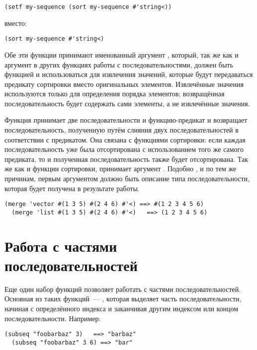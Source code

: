\begin{lstlisting}[style=lisprepl]
  (setf my-sequence (sort my-sequence #'string<))
\end{lstlisting}

\noindent{}вместо:

\begin{lstlisting}[style=lisprepl]
  (sort my-sequence #'string<)
\end{lstlisting}

Обе эти функции принимают именованный аргумент , который, так же как и аргумент
 в других функциях работы с последовательностями, должен быть функцией и
использоваться для извлечения значений, которые будут передаваться предикату сортировки
вместо оригинальных элементов.  Извлечённые значения используются только для определения
порядка элементов; возвращённая последовательность будет содержать сами элементы, а не
извлечённые значения.

Функция  принимает две последовательности и функцию-предикат и возвращает
последовательность, полученную путём слияния двух последовательностей в соответствии с
предикатом.  Она связана с функциями сортировки: если каждая последовательность
уже была отсортирована с использованием того же самого предиката, то и полученная
последовательность также будет отсортирована.  Так же как и функции сортировки,
 принимает аргумент .  Подобно , и по тем же
причинам, первым аргументом  должно быть описание типа последовательности,
которая будет получена в результате работы.

\begin{lstlisting}[style=lisprepl]
  (merge 'vector #(1 3 5) #(2 4 6) #'<) ==> #(1 2 3 4 5 6)
  (merge 'list #(1 3 5) #(2 4 6) #'<)   ==> (1 2 3 4 5 6)
\end{lstlisting}

\section{Работа с частями последовательностей}

Еще один набор функций позволяет работать с частями последовательностей.  Основная из
таких функций~--- , которая выделяет часть последовательности,
начиная с определённого индекса и заканчивая другим индексом или концом
последовательности.  Например:

\begin{lstlisting}[style=lisprepl]
  (subseq "foobarbaz" 3)   ==> "barbaz"
  (subseq "foobarbaz" 3 6) ==> "bar"
\end{lstlisting}

